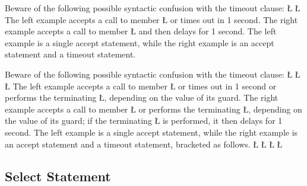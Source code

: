 \documentclass[openright,twoside]{report}
\begin{document}
\begin{annotation}
 Beware of the following possible syntactic confusion with the timeout clause:
\LGinlinefalse\LGbegin\lgrinde
\L{}
\L{}
\endlgrinde\LGend
The left example accepts a call to member \LGinlinetrue\LGbegin\lgrinde\L{}\endlgrinde\LGend{} or times out in 1 second.
The right example accepts a call to member \LGinlinetrue\LGbegin\lgrinde\L{}\endlgrinde\LGend{} and then delays for 1 second.
The left example is a single accept statement, while the right example is an accept statement and a timeout statement.
\end{annotation}

\begin{annotation}
 Beware of the following possible syntactic confusion with the timeout clause:
\LGinlinefalse\LGbegin\lgrinde
\L{}
\L{}
\L{}
\endlgrinde\LGend
The left example accepts a call to member \LGinlinetrue\LGbegin\lgrinde\L{}\endlgrinde\LGend{} or times out in 1 second or performs the terminating \LGinlinetrue\LGbegin\lgrinde\L{}\endlgrinde\LGend{}, depending on the value of its guard.
The right example accepts a call to member \LGinlinetrue\LGbegin\lgrinde\L{}\endlgrinde\LGend{} or performs the terminating \LGinlinetrue\LGbegin\lgrinde\L{}\endlgrinde\LGend{}, depending on the value of its guard;
if the terminating \LGinlinetrue\LGbegin\lgrinde\L{}\endlgrinde\LGend{} is performed, it then delays for 1 second.
The left example is a single accept statement, while the right example is an accept statement and a timeout statement, bracketed as follows.
\LGinlinefalse\LGbegin\lgrinde
\L{}
\L{}
\L{\LB{}}
\L{\LB{\}}}
\endlgrinde\LGend
\end{annotation}


\subsection{Select Statement}
\label{s:TimeoutSelectStatement}
\end{document}
